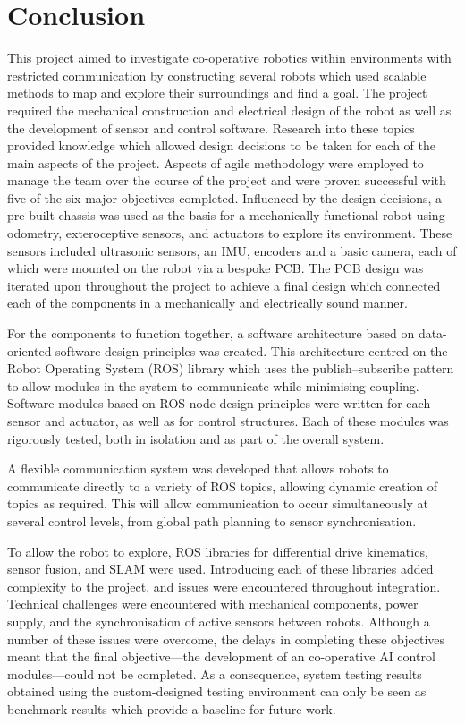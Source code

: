 
\chapter{Conclusion}\label{conclusion}
This project aimed to investigate co-operative robotics within environments
with restricted communication by constructing several robots
which used scalable methods to map and explore their surroundings and find
a goal. The project required the mechanical construction and
electrical design of the robot as well as the development of sensor and
control software.  Research into these topics provided knowledge which allowed
design decisions to be taken for each of the main aspects of the project.
Aspects of agile methodology were employed to manage the team over the course of
the project and were proven successful with five of the six major objectives
completed. Influenced by the design decisions, a pre-built chassis was
used as the basis for a mechanically functional robot using odometry,
exteroceptive sensors, and actuators to explore its environment. These sensors
included ultrasonic sensors, an IMU, encoders and a basic
camera, each of which were mounted on the robot via a bespoke PCB. The PCB
design was iterated upon throughout the project to achieve a final design
which connected each of the components in a mechanically and
electrically sound manner.

For the components to function together, a software
architecture based on data-oriented software design principles was
created. This architecture centred on the Robot Operating System (ROS)
library which uses the publish--subscribe pattern to allow modules in the
system to communicate while minimising coupling. Software modules based on
ROS node design principles were written for each sensor and actuator, as well
as for control structures. Each of these modules was rigorously tested, both
in isolation and as part of the overall system.

A flexible communication system was developed that allows robots to communicate
directly to a variety of ROS topics, allowing dynamic creation of topics as required.
This will allow communication to occur simultaneously at several control levels,
from global path planning to sensor synchronisation.

To allow the robot to explore, ROS libraries for differential drive kinematics,
sensor fusion, and SLAM were used.
Introducing each of these libraries added complexity to the project, and
issues were encountered throughout integration. Technical challenges were
encountered with mechanical components, power supply, and the synchronisation of
active sensors between robots. Although a number of these
issues were overcome, the delays in completing these objectives meant that
the final objective---the development of an co-operative AI control modules---could
not be completed. As a consequence, system testing results obtained using the
custom-designed testing environment can only be seen as benchmark results which
provide a baseline for future work.

